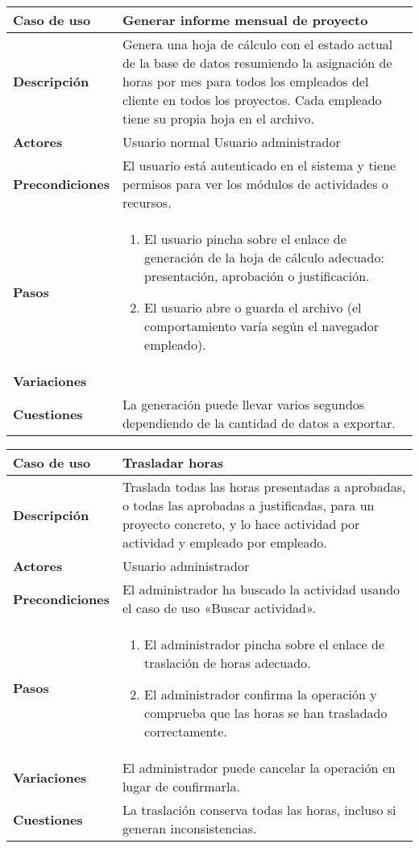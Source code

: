 \begin{tabular}{|p{1.25in}|p{3.65in}|}\hline
\textbf{Caso de uso} & \textbf{Generar informe mensual de
proyecto}\\\hline\hline
\textbf{Descripción} & Genera una hoja de cálculo con el estado actual de la
base de datos resumiendo la asignación de horas por mes para todos los empleados
del cliente en todos los proyectos. Cada empleado tiene su propia hoja en el
archivo.
\\\hline
\textbf{Actores} & Usuario normal \newline Usuario administrador\\\hline
\textbf{Precondiciones} & El usuario está autenticado en el sistema y
tiene permisos para ver los módulos de actividades o recursos. \\\hline
\textbf{Pasos} & 
  \begin{enumerate}
   \item El usuario pincha sobre el enlace de generación de la hoja de cálculo
adecuado: presentación, aprobación o justificación.
   \item El usuario abre o guarda el archivo (el comportamiento varía según el
navegador empleado).
  \end{enumerate}
\\\hline
\textbf{Variaciones} & \\\hline
\textbf{Cuestiones} & La generación puede llevar varios segundos
dependiendo de la cantidad de datos a exportar.\\\hline
\end{tabular}

\begin{tabular}{|p{1.25in}|p{3.65in}|}\hline
\textbf{Caso de uso} & \textbf{Trasladar horas}\\\hline\hline
\textbf{Descripción} & Traslada todas las horas presentadas a aprobadas, o
todas las aprobadas a justificadas, para un proyecto concreto, y lo hace
actividad por actividad y empleado por empleado.
\\\hline
\textbf{Actores} & Usuario administrador\\\hline
\textbf{Precondiciones} & El administrador ha
buscado la actividad usando el caso de uso «Buscar actividad». \\\hline
\textbf{Pasos} & 
  \begin{enumerate}
   \item El administrador pincha sobre el enlace de traslación de horas
adecuado.
   \item El administrador confirma la operación y comprueba que las horas se han
trasladado correctamente.
  \end{enumerate}
\\\hline
\textbf{Variaciones} & El administrador puede cancelar la operación en
lugar de confirmarla. \\\hline
\textbf{Cuestiones} & La traslación conserva todas las horas, incluso
si generan inconsistencias.\\\hline
\end{tabular}


